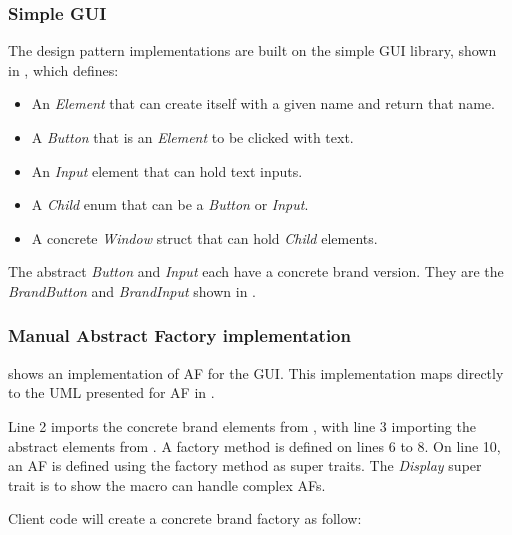 \subsubsection{Simple GUI}
The design pattern implementations are built on the simple GUI library, shown in , which defines:

\begin{itemize}
	\item An \textit{Element} that can create itself with a given name and return that name.
	\item A \textit{Button} that is an \textit{Element} to be clicked with text.
	\item An \textit{Input} element that can hold text inputs.
	\item A \textit{Child} enum that can be a \textit{Button} or \textit{Input}.
	\item A concrete \textit{Window} struct that can hold \textit{Child} elements.
\end{itemize}


The abstract \textit{Button} and \textit{Input} each have a concrete brand version.
They are the \textit{BrandButton} and \textit{BrandInput} shown in .


\subsubsection{Manual Abstract Factory implementation}
 shows an implementation of AF for the GUI.
This implementation maps directly to the UML presented for AF in .


Line 2 imports the concrete brand elements from , with line 3 importing the abstract elements from .
A factory method is defined on lines 6 to 8.
On line 10, an AF is defined using the factory method as super traits.
The \textit{Display} super trait is to show the macro can handle complex AFs.

Client code will create a concrete brand factory as follow:


